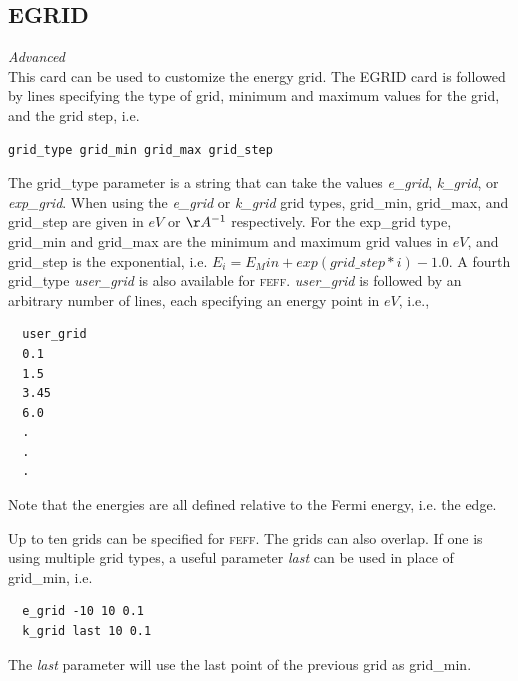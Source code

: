 \documentclass[11pt,oneside]{report} %
\newcommand{\program}[1]{\textsc{#1}}
\newcommand{\feff}{\program{feff}}
\newenvironment{Card}[4]%
      {\vspace{3ex}%
        \subsection{#1}
        \quad\textsl{#3}\newline
        \quad\texttt{#2}\newline%
        \label{card:#4}\\}
      {}
\begin{document}
\begin{Card}{EGRID}{}{Advanced}{egr}
This card can be used to customize the energy grid. The EGRID card is followed
by lines specifying the type of grid, minimum and maximum values for
the grid, and the grid step, i.e.
\begin{verbatim}
grid_type grid_min grid_max grid_step
\end{verbatim}
The grid\_type parameter is a string that can take the values
\textit{e\_grid}, \textit{k\_grid}, or \textit{exp\_grid}.
When using the \textit{e\_grid} or \textit{k\_grid} grid types,
grid\_min, grid\_max, and grid\_step are given in $eV$ or $\AA^{-1}$
respectively. For the exp\_grid type, grid\_min and grid\_max are the
minimum and maximum grid values in $eV$, and grid\_step is the
exponential, i.e.
$E_{i} = E_Min + exp(grid\_step*i) - 1.0$.
A fourth grid\_type \textit{user\_grid} is also
available for {\feff}.
\textit{user\_grid} is followed by an arbitrary number of
lines, each specifying an energy point in $eV$, i.e.,
\begin{verbatim}
  user_grid
  0.1
  1.5
  3.45
  6.0
  .
  .
  .
\end{verbatim}
Note that the energies are all defined relative to the Fermi energy,
i.e. the edge. 

Up to ten grids can be specified for {\feff}.
 The grids can also overlap. If one
is using multiple grid types, a useful parameter \textit{last} can be
used in place of grid\_min, i.e.
\begin{verbatim}
  e_grid -10 10 0.1
  k_grid last 10 0.1
\end{verbatim}
The \textit{last} parameter will use the last point of the previous
grid as grid\_min.
\end{Card}
\end{document}
